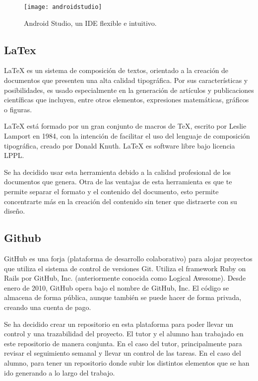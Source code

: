 \begin{figure}[h]
    \centering
    \texttt{[image: androidstudio]}
    \caption{Android Studio, un IDE flexible e intuitivo.}
    \label{fig:androidstudio}
\end{figure}

\subsection{LaTex}

LaTeX es un sistema de composición de textos, orientado a la creación de documentos que presenten una alta calidad tipográfica. Por sus características y posibilidades, es usado especialmente en la generación de artículos y publicaciones científicas que incluyen, entre otros elementos, expresiones matemáticas, gráficos o figuras.

LaTeX está formado por un gran conjunto de macros de TeX, escrito por Leslie Lamport en 1984, con la intención de facilitar el uso del lenguaje de composición tipográfica, creado por Donald Knuth. LaTeX es software libre bajo licencia LPPL.

Se ha decidido usar esta herramienta debido a la calidad profesional de los documentos que genera. Otra de las ventajas de esta herramienta es que te permite separar el formato y el contenido del documento, esto permite concentrarte más en la creación del contenido sin tener que distraerte con su diseño.

\vskip 0.5in

\subsection{Github}

GitHub \cite{URL::Github} es una forja (plataforma de desarrollo colaborativo) para alojar proyectos que utiliza el sistema de control de versiones Git. Utiliza el framework Ruby on Rails por GitHub, Inc.  (anteriormente conocida como Logical Awesome). Desde enero de 2010, GitHub opera bajo el nombre de GitHub, Inc. El código se almacena de forma pública, aunque también se puede hacer de forma privada, creando una cuenta de pago.

Se ha decidido crear un repositorio en esta plataforma para poder llevar un control y una trazabilidad del proyecto. El tutor y el alumno han trabajado en este repositorio de manera conjunta. En el caso del tutor, principalmente para revisar el seguimiento semanal y llevar un control de las tareas. En el caso del alumno, para tener un repositorio donde subir los distintos elementos que se han ido generando a lo largo del trabajo. 

